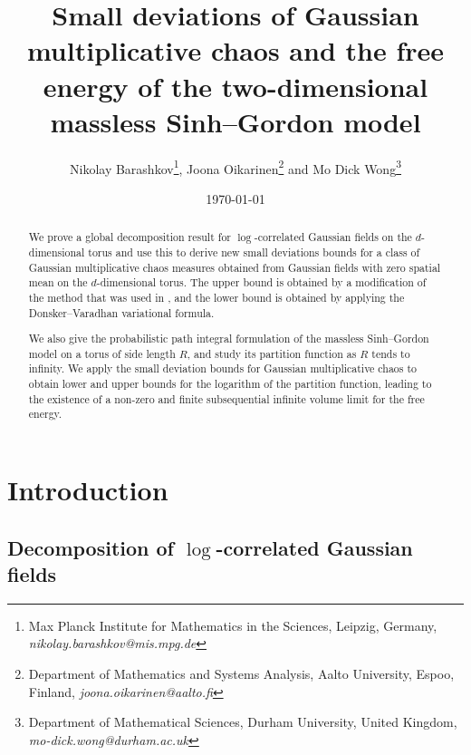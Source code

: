 \documentclass[11pt]{article}
\numberwithin{equation}{section}
\theoremstyle{definition}
\begin{document}
\title{Small deviations of Gaussian multiplicative chaos and the free energy of the two-dimensional massless Sinh--Gordon model 
}

\author{
Nikolay Barashkov\thanks{Max Planck Institute for Mathematics in the Sciences, Leipzig, Germany, \textit{nikolay.barashkov@mis.mpg.de}}\:,
Joona Oikarinen\thanks{Department of Mathematics and Systems Analysis, Aalto University, Espoo, Finland, \textit{joona.oikarinen@aalto.fi}}
and Mo Dick Wong\thanks{Department of Mathematical Sciences, Durham University, United Kingdom, \textit{mo-dick.wong@durham.ac.uk}}}
\date{\today}
\maketitle

\begin{abstract} 
We prove a global decomposition result for $\log$-correlated Gaussian fields on the $d$-dimensional torus and use this to derive new small deviations bounds for a class of Gaussian multiplicative chaos measures obtained from Gaussian fields with zero spatial mean on the $d$-dimensional torus. The upper bound is obtained by a modification of the method that was used in \cite{LRV}, and the lower bound is obtained by applying the Donsker--Varadhan variational formula.

We also give the probabilistic path integral formulation of the massless Sinh--Gordon model on a torus of side length $R$, and study its partition function as $R$ tends to infinity. We apply the small deviation bounds for Gaussian multiplicative chaos to obtain lower and upper bounds for the logarithm of the partition function, leading to the existence of a non-zero and finite subsequential infinite volume limit for the free energy.
\end{abstract}

\maketitle

\setcounter{tocdepth}{2}
\tableofcontents


\section{Introduction}

\subsection{Decomposition of $\log$-correlated Gaussian fields}
\end{document}

